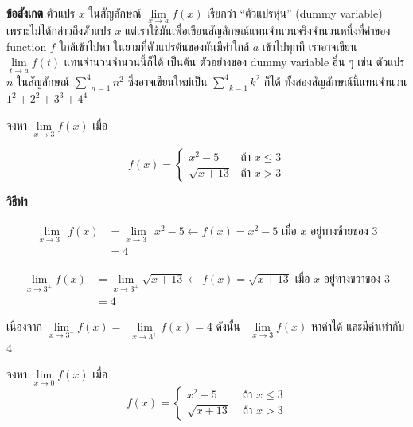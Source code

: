 \documentclass[
]{book}
\begin{document}
\textbf{ข้อสังเกต} ตัวแปร \(x\) ในสัญลักษณ์
\(\underset{x\rightarrow a}{\lim}f\left( x\right)\) เรียกว่า ``ตัวแปรหุ่น''
(dummy variable) เพราะไม่ได้กล่าวถึงตัวแปร \(x\)
แต่เราใช้มันเพื่อเขียนสัญลักษณ์แทนจำนวนจริงจำนวนหนึ่งที่ค่าของ function \(f\)
ใกล้เข้าไปหา ในยามที่ตัวแปรต้นของมันมีค่าใกล้ \(a\) เข้าไปทุกที เราอาจเขียน
\(\underset{t\rightarrow a}{\lim}f\left( t\right)\) แทนจำนวนจำนวนนี้ก็ได้
เป็นต้น ตัวอย่างของ dummy variable อื่น ๆ เช่น ตัวแปร \(n\) ในสัญลักษณ์
\(\underset{n=1}{\overset{4}{\sum }}n^{2}\) ซึ่งอาจเขียนใหม่เป็น
\(\underset{k=1}{\overset{4}{\sum }}k^{2}\) ก็ได้ ทั้งสองสัญลักษณ์นี้แทนจำนวน
\(1^{2}+2^{2}+3^{3}+4^{4}\)

\label{ex-limit-10}
จงหา \(\underset{x\rightarrow 3}{\lim}f\left( x\right)\) เมื่อ

\[
f(x) =
\begin{cases}
x^2 - 5 & \text{ถ้า } x \leq 3 \\
\sqrt{x + 13} & \text{ถ้า } x > 3
\end{cases}
\]

\textbf{วิธีทำ}

\begin{equation}
  \begin{aligned}
    \underset{x\rightarrow 3^{-}}{\lim}f\left( x\right)
    &=\underset{x\rightarrow 3^{-}}{\lim}x^{2}-5 \leftarrow \boxed{  f(x) = x^{2}-5  \mbox{ เมื่อ $x$ อยู่ทางซ้ายของ 3}}\\
    &=4
  \end{aligned}
\end{equation}

\begin{equation}
  \begin{aligned}
    \underset{x\rightarrow 3^{+}}{\lim}f\left( x\right)
        &= \underset{x\rightarrow 3^{+}}{\lim}\sqrt{x+13} \leftarrow
        \boxed{ f(x)=\sqrt{x+13} \mbox{ เมื่อ $x$ อยู่ทางขวาของ 3}} \\
        &=4
  \end{aligned}
\end{equation}

เนื่องจาก
\(\underset{x\rightarrow 3^{-}}{\lim}f\left( x\right) =\)~\(\underset{x\rightarrow 3^{+}}{\lim}f\left( x\right) =4\)
ดังนั้น ~\(\underset{x\rightarrow 3}{\lim}f\left( x\right)\) หาค่าได้
และมีค่าเท่ากับ 4

\label{ex-limit-11}
จงหา \(\underset{x\rightarrow 0}{\lim}f\left( x\right)\) เมื่อ
\[f(x) = \begin{cases}
            x^{2}-5 & \text{ ถ้า } x\leq 3 \\
            \sqrt{x+13}  & \text{ ถ้า } x>3
              \end{cases}\]
\end{document}
